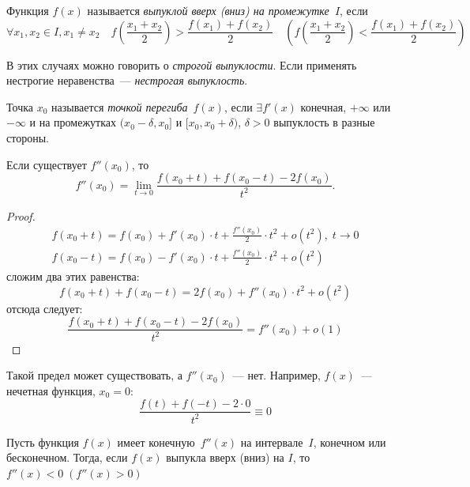 \setcounter{section}{4}
\setcounter{subsection}{4}

\begin{definition}
Функция \(f(x)\) называется \textit{выпуклой вверх (вниз) на промежутке~\(I\)}, если
\[
    \forall x_1, x_2 \in I, x_1 \neq x_2 \quad f\left(\frac{x_1 + x_2}{2}\right) > \frac{f(x_1) +
        f(x_2)}{2} \quad \left(f\left(\frac{x_1 + x_2}{2}\right) < \frac{f(x_1) + f(x_2)}{2}\right)
\]
\end{definition}

В этих случаях можно говорить о \textit{строгой выпуклости}. Если применять нестрогие неравенства~---
\textit{нестрогая выпуклость}.

\begin{definition}
Точка \(x_0\) называется \textit{точкой перегиба}~\(f(x)\), если \(\exists f'(x)\) конечная,
\(+\infty\) или \(-\infty\) и на промежутках \((x_0 - \delta, x_0]\) и \([x_0, x_0 + \delta)\),
\(\delta > 0\) выпуклость в разные стороны.
\end{definition}

\begin{statement}
Если существует \(f''(x_0)\), то
\[
    f''(x_0) = \lim_{t \rightarrow 0} \frac{f(x_0 + t) + f(x_0 - t) - 2f(x_0)}{t^2}.
\]
\end{statement}

\begin{proof}
\begin{gather}
    f(x_0 + t) = f(x_0) + f'(x_0) \cdot t + \frac{f''(x_0)}{2} \cdot t^2 + o(t^2), \; t \rightarrow
        0\\
    f(x_0 - t) = f(x_0) - f'(x_0) \cdot t + \frac{f''(x_0)}{2} \cdot t^2 + o(t^2)
\end{gather}
сложим два этих равенства:
\[
    f(x_0 + t) + f(x_0 - t) = 2f(x_0) + f''(x_0) \cdot t^2 + o(t^2)
\]
отсюда следует:
\[
    \frac{f(x_0 + t) + f(x_0 - t) - 2f(x_0)}{t^2} = f''(x_0) + o(1)
\]
\end{proof}

\begin{note}
Такой предел может существовать, а \(f''(x_0)\)~--- нет. Например, \(f(x)\)~--- нечетная функция,
\(x_0 = 0\):
\[
    \frac{f(t) + f(-t) - 2 \cdot 0}{t^2} \equiv 0
\]
\end{note}

\begin{theorem}
Пусть функция \(f(x)\) имеет конечную~\(f''(x)\) на интервале~\(I\), конечном или бесконечном. Тогда,
если \(f(x)\) выпукла вверх (вниз) на \(I\), то \(f''(x) < 0 \; (f''(x) > 0)\)
\end{theorem}

